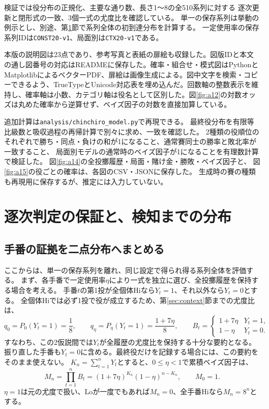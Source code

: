 \documentclass[11pt,a4paper]{article}
\numberwithin{equation}{section}
\begin{document}
検証では役分布の正規化、主要な通り数、長さ1〜8の全510系列に対する
逐次更新と閉形式の一致、3個一式の尤度比を確認している。
単一の保存系列は挙動の例示とし、別途、第\ref{sec:performance}節で系列全体の初到達分布を計算する。
一定使用率の保存系列IDは\texttt{CONST20-v1}、局面別は\texttt{CTX20-v1}である。

本版の説明図は23点であり、参考写真と表紙の扉絵も収録した。図版IDと本文の通し図番号の対応はREADMEに保存した。確率・組合せ・模式図はPythonとMatplotlibによるベクターPDF、扉絵は画像生成による。図中文字を検索・コピーできるよう、TrueTypeとUnicode対応表を埋め込んだ。回数軸の整数表示を維持し、確率軸は小数、カテゴリ軸は役名として区別した。図\ref{fig:a12}の対数オッズは丸めた確率から逆算せず、ベイズ因子の対数を直接加算している。

追加計算は\texttt{analysis/chinchiro\_model.py}で再現できる。
最終役分布を有限等比級数と吸収過程の再帰計算で別々に求め、一致を確認した。
2種類の役順位のそれぞれで勝ち・同点・負けの和が1になること、通常賽同士の勝率と敗北率が一致すること、
局面別モデルの通常時のベイズ因子が1になることを有理数計算で検証した。
図\ref{fig:a14}の全投擲履歴・局面・賭け金・勝敗・ベイズ因子と、
図\ref{fig:a15}の役ごとの確率は、各図のCSV・JSONに保存した。
生成時の賽の種類も再現用に保存するが、推定には入力していない。

\clearpage
\section{逐次判定の保証と、検知までの分布}\label{sec:performance}
\subsection{手番の証拠を二点分布へまとめる}
ここからは、単一の保存系列を離れ、同じ設定で得られ得る系列全体を評価する。
まず、各手番で一定使用率$\eta$により一式を独立に選び、全投擲履歴を保持する場合を考える。
手番$t$の第1投が全個体Hiなら$Y_t=1$、それ以外なら$Y_t=0$とする。
全個体Hiでは必ず1投で役が成立するため、第\ref{sec:context}節までの尤度比は、
\begin{equation}
q_0=P_0(Y_t=1)=\frac18,\qquad
q_\eta=P_\eta(Y_t=1)=\frac{1+7\eta}{8},\qquad
B_t=\begin{cases}1+7\eta&Y_t=1,\\1-\eta&Y_t=0.\end{cases}
\label{eq:binary-turn}
\end{equation}
すなわち、この2仮説間では$Y_t$が全履歴の尤度比を保持する十分な要約となる。
振り直した手番も$Y_t=0$に含める。最終役だけを記録する場合には、この要約をそのまま使えない。
$K_n=\sum_{t=1}^nY_t$とすると、$0\le\eta<1$で累積ベイズ因子は、
\begin{equation}
M_n=\prod_{t=1}^nB_t=(1+7\eta)^{K_n}(1-\eta)^{n-K_n},\qquad M_0=1.
\label{eq:BF-counts}
\end{equation}
$\eta=1$は元の尤度で扱い、Loが一度でもあれば$M_n=0$、全手番Hiなら$M_n=8^n$とする。
\end{document}
